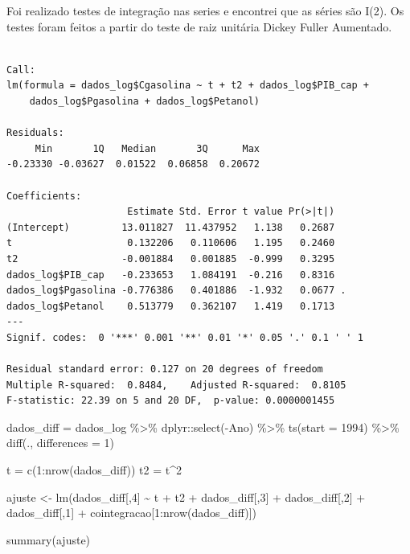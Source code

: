 \documentclass[
  letterpaper,
  DIV=11,
  numbers=noendperiod]{scrartcl}
\newenvironment{Shaded}{\begin{snugshade}}{\end{snugshade}}
\newcommand{\AttributeTok}[1]{\textcolor[rgb]{0.40,0.45,0.13}{#1}}
\newcommand{\DecValTok}[1]{\textcolor[rgb]{0.68,0.00,0.00}{#1}}
\newcommand{\FunctionTok}[1]{\textcolor[rgb]{0.28,0.35,0.67}{#1}}
\newcommand{\NormalTok}[1]{\textcolor[rgb]{0.00,0.23,0.31}{#1}}
\newcommand{\OtherTok}[1]{\textcolor[rgb]{0.00,0.23,0.31}{#1}}
\newcommand{\SpecialCharTok}[1]{\textcolor[rgb]{0.37,0.37,0.37}{#1}}
\begin{document}
Foi realizado testes de integração nas series e encontrei que as séries
são I(2). Os testes foram feitos a partir do teste de raiz unitária
Dickey Fuller Aumentado.

\begin{verbatim}

Call:
lm(formula = dados_log$Cgasolina ~ t + t2 + dados_log$PIB_cap + 
    dados_log$Pgasolina + dados_log$Petanol)

Residuals:
     Min       1Q   Median       3Q      Max 
-0.23330 -0.03627  0.01522  0.06858  0.20672 

Coefficients:
                     Estimate Std. Error t value Pr(>|t|)  
(Intercept)         13.011827  11.437952   1.138   0.2687  
t                    0.132206   0.110606   1.195   0.2460  
t2                  -0.001884   0.001885  -0.999   0.3295  
dados_log$PIB_cap   -0.233653   1.084191  -0.216   0.8316  
dados_log$Pgasolina -0.776386   0.401886  -1.932   0.0677 .
dados_log$Petanol    0.513779   0.362107   1.419   0.1713  
---
Signif. codes:  0 '***' 0.001 '**' 0.01 '*' 0.05 '.' 0.1 ' ' 1

Residual standard error: 0.127 on 20 degrees of freedom
Multiple R-squared:  0.8484,    Adjusted R-squared:  0.8105 
F-statistic: 22.39 on 5 and 20 DF,  p-value: 0.0000001455
\end{verbatim}

\begin{Shaded}
\begin{Highlighting}[]
\NormalTok{dados\_diff }\OtherTok{=}\NormalTok{ dados\_log }\SpecialCharTok{\%\textgreater{}\%} 
\NormalTok{  dplyr}\SpecialCharTok{::}\FunctionTok{select}\NormalTok{(}\SpecialCharTok{{-}}\NormalTok{Ano) }\SpecialCharTok{\%\textgreater{}\%} 
  \FunctionTok{ts}\NormalTok{(}\AttributeTok{start =} \DecValTok{1994}\NormalTok{) }\SpecialCharTok{\%\textgreater{}\%} 
  \FunctionTok{diff}\NormalTok{(., }\AttributeTok{differences =} \DecValTok{1}\NormalTok{)}


\NormalTok{t }\OtherTok{=} \FunctionTok{c}\NormalTok{(}\DecValTok{1}\SpecialCharTok{:}\FunctionTok{nrow}\NormalTok{(dados\_diff))}
\NormalTok{t2 }\OtherTok{=}\NormalTok{ t}\SpecialCharTok{\^{}}\DecValTok{2}

\NormalTok{ajuste }\OtherTok{\textless{}{-}} \FunctionTok{lm}\NormalTok{(dados\_diff[,}\DecValTok{4}\NormalTok{] }\SpecialCharTok{\textasciitilde{}}\NormalTok{ t }\SpecialCharTok{+}\NormalTok{ t2 }\SpecialCharTok{+}\NormalTok{ dados\_diff[,}\DecValTok{3}\NormalTok{] }\SpecialCharTok{+}\NormalTok{ dados\_diff[,}\DecValTok{2}\NormalTok{] }\SpecialCharTok{+}\NormalTok{ dados\_diff[,}\DecValTok{1}\NormalTok{] }\SpecialCharTok{+}\NormalTok{ cointegracao[}\DecValTok{1}\SpecialCharTok{:}\FunctionTok{nrow}\NormalTok{(dados\_diff)])}

\FunctionTok{summary}\NormalTok{(ajuste)}
\end{Highlighting}
\end{Shaded}
\end{document}

